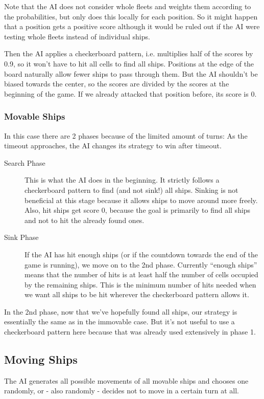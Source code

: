 \documentclass[a4paper]{easychair}
\begin{document}
Note that the AI does not consider whole fleets and weights them according to the probabilities, but only does this locally for each position. So it might happen that a position gets a positive score although it would be ruled out if the AI were testing whole fleets instead of individual ships.

Then the AI applies a checkerboard pattern, i.e. multiplies half of the scores by 0.9, so it won't have to hit all cells to find all ships. Positions at the edge of the board naturally allow fewer ships to pass through them. But the AI shouldn't be biased towards the center, so the scores are divided by the scores at the beginning of the game. If we already attacked that position before, its score is 0.

\subsubsection{Movable Ships} In this case there are 2 phases because of the limited amount of turns: As the timeout approaches, the AI changes its strategy to win after timeout. 
\begin{description}
 \item[Search Phase] 
 This is what the AI does in the beginning. It strictly follows a checkerboard pattern to find (and not sink!) all ships. Sinking is not beneficial at this stage because it allows ships to move around more freely. Also, hit ships get score 0, because the goal is primarily to find all ships and not to hit the already found ones.
 \item[Sink Phase] 
 If the AI has hit enough ships (or if the countdown towards the end of the game is running), we move on to the 2nd phase. Currently ``enough ships'' means that the number of hits is at least half the number of cells occupied by the remaining ships. This is the minimum number of hits needed when we want all ships to be hit wherever the checkerboard pattern allows it.
\end{description}
In the 2nd phase, now that we've hopefully found all ships, our strategy is essentially the same as in the immovable case. But it's not useful to use a checkerboard pattern here because that was already used extensively in phase 1.



\subsection{Moving Ships}
The AI generates all possible movements of all movable ships and chooses one randomly, or - also randomly - decides not to move in a certain turn at all.

%
\label{sect:bib}

%
%
%
%


\end{document}
